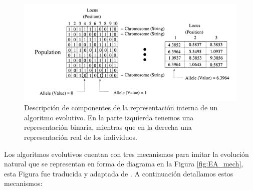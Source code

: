 \begin{figure}[H]
    \centering
    \includegraphics[width=\textwidth]{Figuras/EA_components.png}
    \caption[Componentes algoritmo evolutivo]{Descripción de componentes de la representación interna de un algoritmo evolutivo. En la parte izquierda tenemos una representación binaria, mientras que en la derecha una representación real de los individuos.}
    \label{fig:EA_components}
\end{figure}

Los algoritmos evolutivos cuentan con tres mecanismos para imitar la evolución natural que se representan en forma de diagrama en la Figura \ref{fig:EA_mech}, esta Figura fue traducida y adaptada de \cite{coelloEvolutionaryAlgorithmsSolving}. A continuación detallamos estos mecanismos: 

